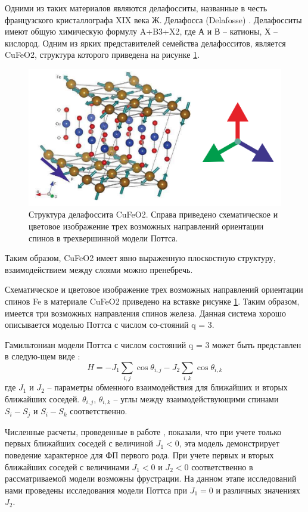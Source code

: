 Одними из таких материалов являются делафосситы, названные в честь французского кристаллографа XIX века Ж. Делафосса  (Delafosse) \cite{phys3-bib-2, phys3-bib-3}. Делафосситы имеют общую химическую формулу A+B3+X2, где А и В – катионы, Х – кислород. Одним из ярких представителей семейства делафосситов, является CuFeO2, структура которого приведена на рисунке \ref{phys3-pic-1}.

\begin{figure}[H]
	\centering
	\includegraphics[width=0.5\linewidth]{content/sections/images/phys3-1}
	\caption{Структура делафоссита CuFeO2. Справа приведено схематическое и цветовое изображение трех возможных направлений ориентации спинов в трехвершинной  модели Поттса.}
	\label{phys3-pic-1}
\end{figure}





Таким образом, CuFeO2  имеет явно выраженную плоскостную структуру, взаимодействием между слоями можно пренебречь.

Схематическое и цветовое изображение трех возможных направлений ориентации спинов  Fe  в материале CuFeO2 приведено на вставке рисунке \ref{phys3-pic-1}. Таким образом, имеется три возможных направления спинов железа. Данная система хорошо описывается моделью Поттса с числом со-стояний q = 3.

Гамильтониан модели Поттса с числом состояний q = 3 может быть представлен в следую-щем виде \cite{phys3-bib-4}:
\begin{equation}
	H = -J_1 \sum_{i,j}\cos\theta_{i,j}-J_2\sum_{i,k}\cos\theta_{i, k}
\end{equation}
где $J_1$ и $J_2$ – параметры обменного взаимодействия для ближайших и вторых ближайших соседей. $\theta_{i,j}$, $\theta_{i,k}$ – углы между взаимодействующими спинами $S_i - S_j$ и $S_i - S_k$ соответственно.

Численные расчеты, проведенные в работе \cite{phys3-bib-4}, показали, что при учете только первых ближайших соседей с величиной $J_1<0$, эта модель демонстрирует поведение характерное для ФП первого рода. При учете первых и вторых ближайших соседей с величинами $J_1<0$ и $J_2<0$ соответственно в рассматриваемой модели возможны фрустрации. На данном этапе исследований нами проведены исследования модели Поттса при $J_1 = 0$ и различных значениях $J_2$.




